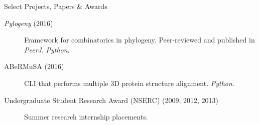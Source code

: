 \documentclass{resume} %
\begin{document}

\begin{rSection}{Select Projects, Papers \& Awards}

\begin{description}
\item [\textit{Pylogeny} (2016)] Framework for combinatorics in phylogeny. Peer-reviewed and published in \textit{PeerJ}. \textit{Python}.
\item [ABeRMuSA (2016)] CLI that performs multiple 3D protein structure alignment. \textit{Python}.
\item [Undergraduate Student Research Award (NSERC) (2009, 2012, 2013)] Summer research internship placements.
\end{description}

\end{rSection}

\end{document}
